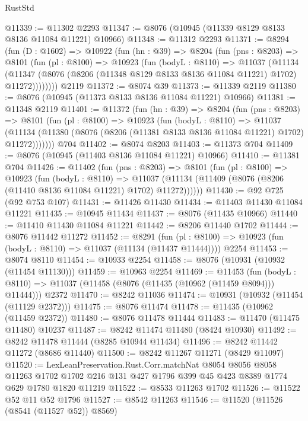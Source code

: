 \begin{lexlean}{RustStd}
\begin{coremodule}
@11339 := @11302 @2293
@11347 := @8076 (@10945 (@11339 @8129 @8133 @8136 @11084 @11221) @10966)
@11348 := @11312 @2293
@11371 := @8294
    (fun (D : @1602) =>
    @10922
      (fun (hn : @39) =>
      @8204
        (fun (pns : @8203) =>
        @8101
          (fun (pl : @8100) =>
          @10923
            (fun (bodyL : @8110) =>
            @11037
              (@11134
                (@11347 (@8076 (@8206 (@11348 @8129 @8133 @8136 @11084 @11221) @1702) @11272))))))))
    @2119
@11372 := @8074 @39
@11373 := @11339 @2119
@11380 := @8076 (@10945 (@11373 @8133 @8136 @11084 @11221) @10966)
@11381 := @11348 @2119
@11401 := @11372
    (fun (hn : @39) =>
    @8204
      (fun (pns : @8203) =>
      @8101
        (fun (pl : @8100) =>
        @10923
          (fun (bodyL : @8110) =>
          @11037
            (@11134 (@11380 (@8076 (@8206 (@11381 @8133 @8136 @11084 @11221) @1702) @11272)))))))
    @704
@11402 := @8074 @8203
@11403 := @11373 @704
@11409 := @8076 (@10945 (@11403 @8136 @11084 @11221) @10966)
@11410 := @11381 @704
@11426 := @11402
    (fun (pns : @8203) =>
    @8101
      (fun (pl : @8100) =>
      @10923
        (fun (bodyL : @8110) =>
        @11037 (@11134 (@11409 (@8076 (@8206 (@11410 @8136 @11084 @11221) @1702) @11272))))))
@11430 := @92 @725 (@92 @753 @107)
@11431 := @11426 @11430
@11434 := @11403 @11430 @11084 @11221
@11435 := @10945 @11434
@11437 := @8076 (@11435 @10966)
@11440 := @11410 @11430 @11084 @11221
@11442 := @8206 @11440 @1702
@11444 := @8076 @11442 @11272
@11452 := @8291
    (fun (pl : @8100) => @10923 (fun (bodyL : @8110) => @11037 (@11134 (@11437 @11444))))
    @2254
@11453 := @8074 @8110
@11454 := @10933 @2254
@11458 := @8076 (@10931 (@10932 (@11454 @11130)))
@11459 := @10963 @2254
@11469 := @11453
    (fun (bodyL : @8110) => @11037 (@11458 (@8076 (@11435 (@10962 (@11459 @8094))) @11444)))
    @2372
@11470 := @8242 @11036
@11474 := @10931 (@10932 (@11454 (@11129 @2372)))
@11475 := @8076 @11474
@11478 := @11435 (@10962 (@11459 @2372))
@11480 := @8076 @11478 @11444
@11483 := @11470 (@11475 @11480) @10237
@11487 := @8242 @11474 @11480 (@8424 @10930)
@11492 := @8242 @11478 @11444 (@8285 @10944 @11434)
@11496 := @8242 @11442 @11272 (@8686 @11440)
@11500 := @8242 @11267 @11271 (@8429 @11097)
@11520 := LexLeanPreservation.Rust.Corr.matchNat
    @8054
    @8056
    @8058
    @11263
    @1702
    @1702
    @216
    @131
    @427
    @1796
    @399
    @45
    @423
    @8389
    @1774
    @629
    @1780
    @1820
    @11219
@11522 := @8533 @11263 @1702
@11526 := @11522 @52 @11 @52 @1796
@11527 := @8542 @11263
@11546 := @11520
    (@11526 (@8541 (@11527 @52)) @8569)

\end{coremodule}
\end{lexlean}
